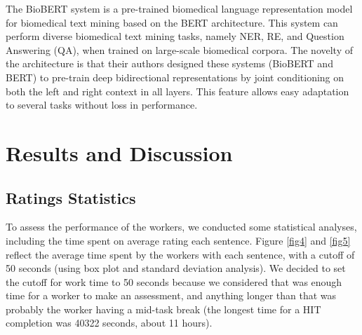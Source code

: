 The BioBERT system is a pre-trained biomedical language representation model for biomedical text mining based on the BERT \citep{devlin2019bert} architecture. This system can perform diverse biomedical text mining tasks, namely NER, RE, and Question Answering (QA), when trained on large-scale biomedical corpora. The novelty of the architecture is that their authors designed these systems (BioBERT and BERT) to pre-train deep bidirectional representations by joint conditioning on both the left and right context in all layers. This feature allows easy adaptation to several tasks without loss in performance.

\section{Results and Discussion}

\subsection{Ratings Statistics}

To assess the performance of the workers, we conducted some statistical analyses, including the time spent on average rating each sentence. Figure \ref{fig4} and \ref{fig5} reflect the average time spent by the workers with each sentence, with a cutoff of 50 seconds (using box plot and standard deviation analysis). We decided to set the cutoff for work time to 50 seconds because we considered that was enough time for a worker to make an assessment, and anything longer than that was probably the worker having a mid-task break (the longest time for a HIT completion was 40322 seconds, about 11 hours). 

